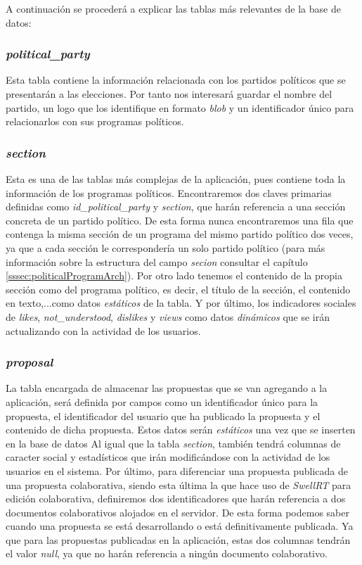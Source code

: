 A continuación se procederá a explicar las tablas más relevantes de la base de datos:

\subsubsection{\textit{political\_party}}

Esta tabla contiene la información relacionada con los partidos políticos que se presentarán a las elecciones. Por tanto nos interesará guardar el nombre del partido, un logo que los identifique en formato \textit{blob} y un identificador único para relacionarlos con sus programas políticos.

\subsubsection{\textit{section}}

Esta es una de las tablas más complejas de la aplicación, pues contiene toda la información de los programas políticos. Encontraremos dos claves primarias definidas como \textit{id\_political\_party} y \textit{section}, que harán referencia a una sección concreta de un partido político. De esta forma nunca encontraremos una fila que contenga la misma sección de un programa del mismo partido político dos veces, ya que a cada sección le correspondería un solo partido político (para más información sobre la estructura del campo \textit{secion} consultar el capítulo \ref{sssec:politicalProgramArch}). Por otro lado tenemos el contenido de la propia sección como del programa político, es decir, el título de la sección, el contenido en texto,...como datos \textit{estáticos} de la tabla. Y por último, los indicadores sociales de \textit{likes}, \textit{not\_understood}, \textit{dislikes} y \textit{views} como datos \textit{dinámicos} que se irán actualizando con la actividad de los usuarios.

\subsubsection{\textit{proposal}}

La tabla encargada de almacenar las propuestas que se van agregando a la aplicación, será definida por campos como un identificador único para la propuesta, el identificador del usuario que ha publicado la propuesta y el contenido de dicha propuesta. Estos datos serán \textit{estáticos} una vez que se inserten en la base de datos Al igual que la tabla \textit{section}, también tendrá columnas de caracter social y estadísticos que irán modificándose con la actividad de los usuarios en el sistema. Por último, para diferenciar una propuesta publicada de una propuesta colaborativa, siendo esta última la que hace uso de \textit{SwellRT} para edición colaborativa, definiremos dos identificadores que harán referencia a dos documentos colaborativos alojados en el servidor. De esta forma podemos saber cuando una propuesta se está desarrollando o está definitivamente publicada. Ya que para las propuestas publicadas en la aplicación, estas dos columnas tendrán el valor \textit{null}, ya que no harán referencia a ningún documento colaborativo.

